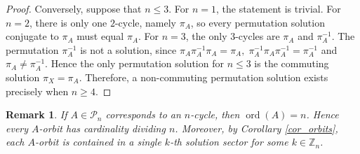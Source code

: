 \documentclass{article}
\newtheorem{remark}{Remark}[section]
\theoremstyle{definition}\newtheorem{example}{Example}[section]
\def\P{{\mathcal{P}}}
\begin{document}
\begin{proof}
		Conversely, suppose that $n\leq 3$. For $n=1$, the statement is trivial. For $n=2$, there is only one $2$-cycle, namely $\pi_A$, so every permutation solution conjugate to $\pi_A$ must equal $\pi_A$. For $n=3$, the only $3$-cycles are $\pi_A$ and $\pi_A^{-1}$. The permutation $\pi_A^{-1}$ is not a solution, since $\pi_A \pi_A^{-1}\pi_A=\pi_A, \; \pi_A^{-1}\pi_A \pi_A^{-1}=\pi_A^{-1}$ and $\pi_A\neq \pi_A^{-1}$. Hence the only permutation solution for $n\leq 3$ is the commuting solution $\pi_X=\pi_A$. Therefore, a non-commuting permutation solution exists precisely when $n\geq 4.$
	\end{proof}
	
	\begin{remark}
		If $A\in\P_n$ corresponds to an $n$-cycle, then $\operatorname{ord}(A)=n$.
		Hence every $A$-orbit has cardinality dividing $n$.
		Moreover, by Corollary \ref{cor_orbits}, each $A$-orbit is contained in
		a single $k$-th solution sector for some $k\in\mathbb{Z}_n$.
	\end{remark}
	
\end{document}
